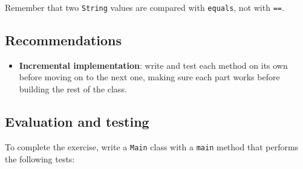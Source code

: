 Remember that two \texttt{String} values are compared with \texttt{equals}, not with \texttt{==}.

\subsection{Recommendations}

\begin{itemize}

    \item \textbf{Incremental implementation}: write and test each method on its own before moving on to the next one, making sure each part works before building the rest of the class.

\end{itemize}

\subsection{Evaluation and testing}

To complete the exercise, write a \texttt{Main} class with a \texttt{main} method that performs the following tests:

